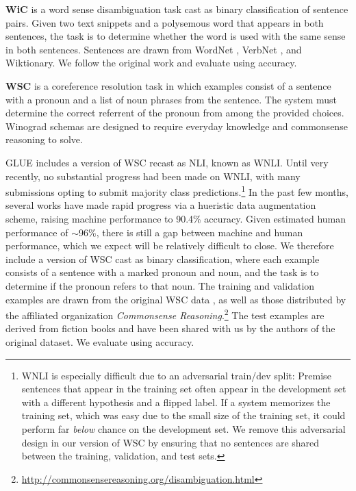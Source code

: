\textbf{WiC} \citep[Word-in-Context,][]{pilehvar2018wic} is a word sense disambiguation task cast as binary classification of sentence pairs. 
Given two text snippets and a polysemous %
word that appears in both sentences, the task is to determine whether the word is used with the same sense in both sentences. 
Sentences are drawn from WordNet \citep{miller1995wordnet}, VerbNet \citep{schuler2005verbnet}, and Wiktionary.
We follow the original work and evaluate using accuracy.

\textbf{WSC} \citep[Winograd Schema Challenge,][]{levesque2012winograd} is a coreference resolution task in which examples consist of a sentence with a pronoun and a list of noun phrases from the sentence.
The system must determine the correct referrent of the pronoun from among the provided choices.
Winograd schemas are designed to require everyday knowledge and commonsense reasoning to solve.

GLUE includes a version of WSC recast as NLI, known as WNLI.
Until very recently, no substantial progress had been made on WNLI, with many submissions opting to submit majority class predictions.\footnote{WNLI is especially difficult due to an adversarial train/dev split: Premise sentences that appear in the training set often appear in the development set with a different hypothesis and a flipped label. 
If a system memorizes the training set, which was easy due to the small size of the training set, it could perform far \textit{below} chance on the development set. We remove this adversarial design in our version of WSC by ensuring that no sentences are shared between the training, validation, and test sets.}
In the past few months, several works \citep{kocijan2019surprisingly,liu2019mt} have made rapid progress via a hueristic data augmentation scheme, raising machine performance to 90.4\% accuracy.
Given estimated human performance of $\sim$96\%, there is still a gap between machine and human performance, which we expect will be relatively difficult to close.
We therefore include a version of WSC cast as binary classification, where each example consists of a sentence with a marked pronoun and noun, and the task is to determine if the pronoun refers to that noun.
The training and validation examples are drawn from the original WSC data \citep{levesque2012winograd}, as well as those distributed by the affiliated organization \textit{Commonsense Reasoning}.\footnote{\url{http://commonsensereasoning.org/disambiguation.html}} 
The test examples are derived from fiction books and have been shared with us by the authors of the original dataset.
We evaluate using accuracy.

